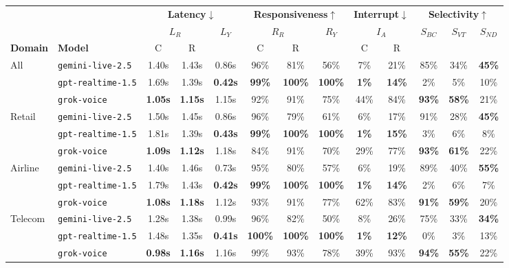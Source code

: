 \begin{tabular}{@{}ll|cc|c|cc|c|cc|ccc@{}}
\toprule
 & & \multicolumn{3}{c|}{\textbf{Latency}$\downarrow$} & \multicolumn{3}{c|}{\textbf{Responsiveness}$\uparrow$} & \multicolumn{2}{c|}{\textbf{Interrupt}$\downarrow$} & \multicolumn{3}{c}{\textbf{Selectivity}$\uparrow$} \\
 & & \multicolumn{2}{c|}{$L_R$} & \multirow{2}{*}{$L_Y$} & \multicolumn{2}{c|}{$R_R$} & \multirow{2}{*}{$R_Y$} & \multicolumn{2}{c|}{$I_A$} & \multirow{2}{*}{$S_{BC}$} & \multirow{2}{*}{$S_{VT}$} & \multirow{2}{*}{$S_{ND}$} \\
\textbf{Domain} & {\color{red!75!black}\textbf{Model}} & C & R & & C & R & & C & R & & & \\
\midrule
\multirow{3}{*}{All} & {\color{red!75!black}\texttt{gemini-live-2.5}} & 1.40s & 1.43s & 0.86s & 96\% & 81\% & 56\% & 7\% & 21\% & 85\% & 34\% & \textbf{45\%} \\
 & {\color{red!75!black}\texttt{gpt-realtime-1.5}} & 1.69s & 1.39s & \textbf{0.42s} & \textbf{99\%} & \textbf{100\%} & \textbf{100\%} & \textbf{1\%} & \textbf{14\%} & 2\% & 5\% & 10\% \\
 & {\color{red!75!black}\texttt{grok-voice}} & \textbf{1.05s} & \textbf{1.15s} & 1.15s & 92\% & 91\% & 75\% & 44\% & 84\% & \textbf{93\%} & \textbf{58\%} & 21\% \\
\midrule
\multirow{3}{*}{Retail} & {\color{red!75!black}\texttt{gemini-live-2.5}} & 1.50s & 1.45s & 0.86s & 96\% & 79\% & 61\% & 6\% & 17\% & 91\% & 28\% & \textbf{45\%} \\
 & {\color{red!75!black}\texttt{gpt-realtime-1.5}} & 1.81s & 1.39s & \textbf{0.43s} & \textbf{99\%} & \textbf{100\%} & \textbf{100\%} & \textbf{1\%} & \textbf{15\%} & 3\% & 6\% & 8\% \\
 & {\color{red!75!black}\texttt{grok-voice}} & \textbf{1.09s} & \textbf{1.12s} & 1.18s & 84\% & 91\% & 70\% & 29\% & 77\% & \textbf{93\%} & \textbf{61\%} & 22\% \\
\midrule
\multirow{3}{*}{Airline} & {\color{red!75!black}\texttt{gemini-live-2.5}} & 1.40s & 1.46s & 0.73s & 95\% & 80\% & 57\% & 6\% & 19\% & 89\% & 40\% & \textbf{55\%} \\
 & {\color{red!75!black}\texttt{gpt-realtime-1.5}} & 1.79s & 1.43s & \textbf{0.42s} & \textbf{99\%} & \textbf{100\%} & \textbf{100\%} & \textbf{1\%} & \textbf{14\%} & 2\% & 6\% & 7\% \\
 & {\color{red!75!black}\texttt{grok-voice}} & \textbf{1.08s} & \textbf{1.18s} & 1.12s & 93\% & 91\% & 77\% & 62\% & 83\% & \textbf{91\%} & \textbf{59\%} & 20\% \\
\midrule
\multirow{3}{*}{Telecom} & {\color{red!75!black}\texttt{gemini-live-2.5}} & 1.28s & 1.38s & 0.99s & 96\% & 82\% & 50\% & 8\% & 26\% & 75\% & 33\% & \textbf{34\%} \\
 & {\color{red!75!black}\texttt{gpt-realtime-1.5}} & 1.48s & 1.35s & \textbf{0.41s} & \textbf{100\%} & \textbf{100\%} & \textbf{100\%} & \textbf{1\%} & \textbf{12\%} & 0\% & 3\% & 13\% \\
 & {\color{red!75!black}\texttt{grok-voice}} & \textbf{0.98s} & \textbf{1.16s} & 1.16s & 99\% & 93\% & 78\% & 39\% & 93\% & \textbf{94\%} & \textbf{55\%} & 22\% \\
\bottomrule
\end{tabular}